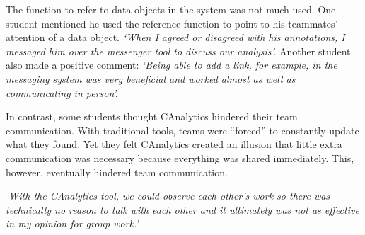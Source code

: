 The function to refer to data objects in the system was not much used. One student mentioned he used the reference function to point to his teammates' attention of a data object. 
\textit{`When I agreed or disagreed with his annotations, I messaged him over the messenger tool to discuss our analysis'.}
 Another student also made a positive comment:
\textit{`Being able to add a link, for example, in the messaging system was very beneficial and worked almost as well as communicating in person'.}

In contrast, some students thought CAnalytics hindered their team communication. With traditional tools, teams were ``forced'' to constantly update what they found. Yet they felt CAnalytics created an illusion that little extra communication was necessary because everything was shared immediately. This, however, eventually hindered team communication.


\textit{`With the CAnalytics tool, we could observe each other’s work so there was technically no reason to talk with each other and it ultimately was not as effective in my opinion for group work.'}



